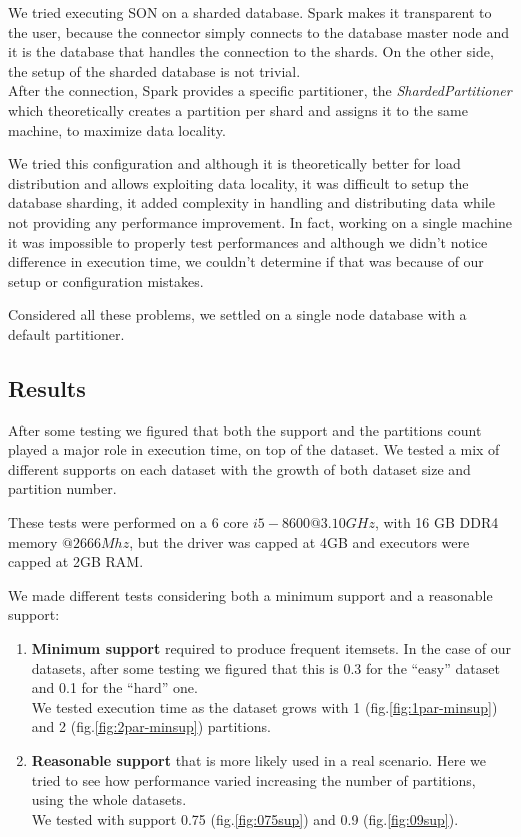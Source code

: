 \documentclass[a4paper]{article}
\begin{document}
	We tried executing SON on a sharded database. Spark makes it transparent to the user, because the connector simply connects to the database master node and it is the database that handles the
	connection to the shards. On the other side, the setup of the sharded database is not trivial.\\
	After the connection, Spark provides a specific partitioner, the \textit{ShardedPartitioner} which theoretically creates a partition per shard and assigns it to the same machine, to maximize data locality.

	We tried this configuration and although it is theoretically better for load distribution and allows exploiting data locality, it was difficult to setup the database sharding, it added complexity 
	in handling and distributing data while not providing any performance improvement. 
	In fact, working on a single machine it was impossible to properly test performances and although we didn't notice difference in execution time, we couldn't determine if that was because of our 
	setup or configuration mistakes.
	
	Considered all these problems, we settled on a single node database with a default partitioner.


	\subsection{Results}
	\label{section:results}
	After some testing we figured that both the support and the partitions count played a major role in execution time, on top of the dataset. We tested a mix of different supports on each dataset with the growth of both dataset size and partition number.

	These tests were performed on a 6 core $i5-8600 @3.10GHz$, with 16 GB DDR4 memory $@2666Mhz$, but the driver was capped at 4GB and executors were capped at 2GB RAM.
	
	We made different tests considering both a minimum support and a reasonable support:
	\begin{enumerate}
		\item \textbf{Minimum support} required to produce frequent itemsets. In the case of our datasets, after some testing we figured that this is 0.3 for the ``easy'' dataset and 0.1 for the ``hard'' one.\\
		We tested execution time as the dataset grows with 1 (fig.\ref{fig:1par-minsup}) and 2 (fig.\ref{fig:2par-minsup}) partitions.
		\item \textbf{Reasonable support} that is more likely used in a real scenario. Here we tried to see how performance varied increasing the number of partitions, using the whole datasets.\\
		We tested with support 0.75 (fig.\ref{fig:075sup}) and 0.9 (fig.\ref{fig:09sup}).
	\end{enumerate}
\end{document}
